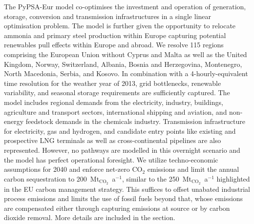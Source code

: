 The PyPSA-Eur\cite{PyPSAEurSecSectorCoupledOpen} model co-optimises the investment
and operation of generation, storage, conversion and transmission
infrastructures in a single linear optimisation problem. The model is further
given the opportunity to relocate ammonia and primary steel production within
Europe capturing potential renewables pull effects within Europe and
abroad.\cite{verpoortImpactGlobalHeterogeneity2024,
samadiRenewablesPullEffect2023,egererIndustryTransformationFossil2024} We
resolve 115 regions comprising the European Union without Cyprus and Malta as
well as the United Kingdom, Norway, Switzerland, Albania, Bosnia and
Herzegovina, Montenegro, North Macedonia, Serbia, and Kosovo. In combination
with a 4-hourly-equivalent time resolution for the weather year of 2013, grid
bottlenecks, renewable variability, and seasonal storage requirements are
sufficiently captured. The  model includes regional demands from the
electricity, industry, buildings, agriculture and transport sectors,
international shipping and aviation, and non-energy feedstock demands in the
chemicals industry. Transmission infrastructure for electricity, gas and
hydrogen, and candidate entry points like existing and prospective LNG terminals
as well as cross-continental pipelines are also represented.  However, no
pathways are modelled in this overnight scenario and the model has perfect
operational foresight. We utilize techno-economic assumptions for 2040 and
enforce net-zero CO$_2$ emissions and limit the annual carbon sequestration to
200~Mt$_{\text{CO}_2}$~a$^{-1}$, similar to the 250~Mt$_{\text{CO}_2}$~a$^{-1}$
highlighted in the EU carbon management
strategy.\cite{europeancommissionAmbitiousIndustrialCarbon2024} This suffices to
offset unabated industrial process emissions and limits the use of fossil fuels
beyond that, whose emissions are compensated either through capturing emissions
at source or by carbon dioxide removal. More details are included in the
 section.
